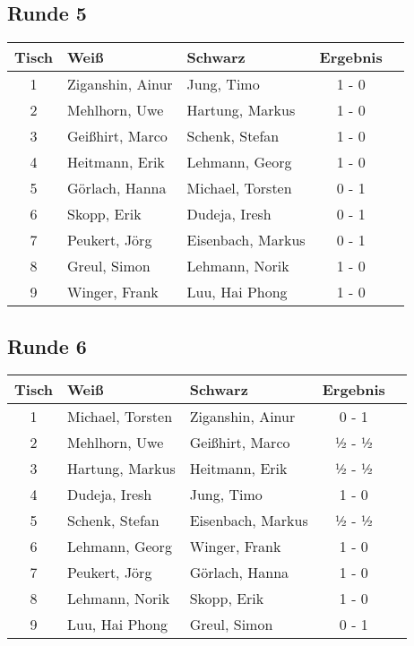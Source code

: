 \documentclass[a4paper,ngerman]{tui-algo-seminar}
\begin{document}
\subsection{Runde 5}
\begin{center}
\begin{tabular}{cllcl}
\toprule
\textbf{Tisch} & \textbf{Weiß} & \textbf{Schwarz} & \textbf{Ergebnis} \\
\midrule
1 & Ziganshin, Ainur & Jung, Timo & 1 - 0 \\
2 & Mehlhorn, Uwe & Hartung, Markus & 1 - 0 \\
3 & Geißhirt, Marco & Schenk, Stefan & 1 - 0 \\
4 & Heitmann, Erik & Lehmann, Georg & 1 - 0 \\
5 & Görlach, Hanna & Michael, Torsten & 0 - 1 \\
6 & Skopp, Erik & Dudeja, Iresh & 0 - 1 \\
7 & Peukert, Jörg & Eisenbach, Markus & 0 - 1 \\
8 & Greul, Simon & Lehmann, Norik & 1 - 0 \\
9 & Winger, Frank & Luu, Hai Phong & 1 - 0 \\
\bottomrule
\end{tabular}
\end{center}

\subsection{Runde 6}
\begin{center}
\begin{tabular}{cllcl}
\toprule
\textbf{Tisch} & \textbf{Weiß} & \textbf{Schwarz} & \textbf{Ergebnis} \\
\midrule
1 & Michael, Torsten & Ziganshin, Ainur & 0 - 1 \\
2 & Mehlhorn, Uwe & Geißhirt, Marco & ½ - ½ \\
3 & Hartung, Markus & Heitmann, Erik & ½ - ½ \\
4 & Dudeja, Iresh & Jung, Timo & 1 - 0 \\
5 & Schenk, Stefan & Eisenbach, Markus & ½ - ½ \\
6 & Lehmann, Georg & Winger, Frank & 1 - 0 \\
7 & Peukert, Jörg & Görlach, Hanna & 1 - 0 \\
8 & Lehmann, Norik & Skopp, Erik & 1 - 0 \\
9 & Luu, Hai Phong & Greul, Simon & 0 - 1 \\
\bottomrule
\end{tabular}
\end{center}
\end{document}
